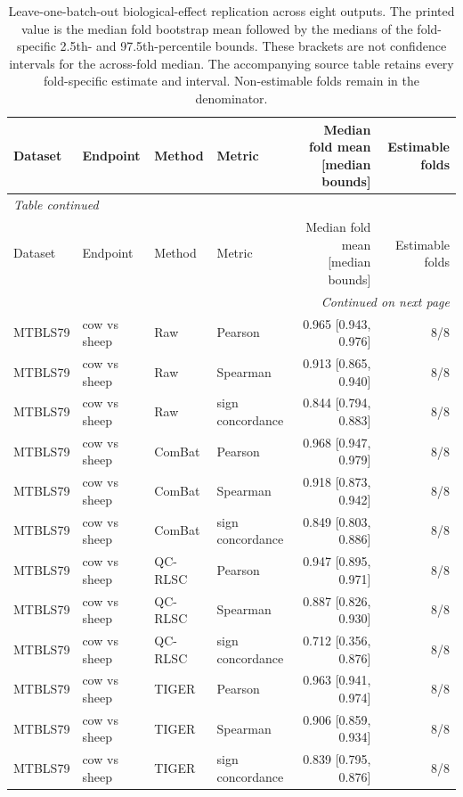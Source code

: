 \begin{landscape}
\begingroup
\renewcommand{\arraystretch}{0.94}
\tiny
\begin{longtable}{llllrr}
\caption{Leave-one-batch-out biological-effect replication across eight outputs. The printed value is the median fold bootstrap mean followed by the medians of the fold-specific 2.5th- and 97.5th-percentile bounds. These brackets are not confidence intervals for the across-fold median. The accompanying source table retains every fold-specific estimate and interval. Non-estimable folds remain in the denominator.}\label{tab:supp_lobo}\\
\toprule
Dataset & Endpoint & Method & Metric & Median fold mean [median bounds] & Estimable folds \\
\midrule
\endfirsthead
\multicolumn{6}{l}{\textit{Table \thetable{} continued}}\\
\toprule
Dataset & Endpoint & Method & Metric & Median fold mean [median bounds] & Estimable folds \\
\midrule
\endhead
\midrule
\multicolumn{6}{r}{\textit{Continued on next page}}\\
\endfoot
\bottomrule
\endlastfoot
MTBLS79 & cow vs sheep & Raw & Pearson & 0.965 [0.943, 0.976] & 8/8 \\
MTBLS79 & cow vs sheep & Raw & Spearman & 0.913 [0.865, 0.940] & 8/8 \\
MTBLS79 & cow vs sheep & Raw & sign concordance & 0.844 [0.794, 0.883] & 8/8 \\
MTBLS79 & cow vs sheep & ComBat & Pearson & 0.968 [0.947, 0.979] & 8/8 \\
MTBLS79 & cow vs sheep & ComBat & Spearman & 0.918 [0.873, 0.942] & 8/8 \\
MTBLS79 & cow vs sheep & ComBat & sign concordance & 0.849 [0.803, 0.886] & 8/8 \\
MTBLS79 & cow vs sheep & QC-RLSC & Pearson & 0.947 [0.895, 0.971] & 8/8 \\
MTBLS79 & cow vs sheep & QC-RLSC & Spearman & 0.887 [0.826, 0.930] & 8/8 \\
MTBLS79 & cow vs sheep & QC-RLSC & sign concordance & 0.712 [0.356, 0.876] & 8/8 \\
MTBLS79 & cow vs sheep & TIGER & Pearson & 0.963 [0.941, 0.974] & 8/8 \\
MTBLS79 & cow vs sheep & TIGER & Spearman & 0.906 [0.859, 0.934] & 8/8 \\
MTBLS79 & cow vs sheep & TIGER & sign concordance & 0.839 [0.795, 0.876] & 8/8 \\

\end{longtable}
\end{landscape}
